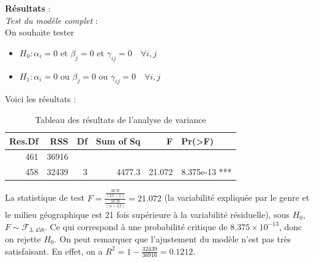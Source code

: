 \documentclass[12pt,a4paper]{article}
\begin{document}
	\textbf{Résultats} : \\
	\textit{Test du modèle complet} : \\
	On souhaite tester
	\begin{itemize}
		\item $H_0 : \alpha_i = 0$ et $\beta_j = 0$ et $\gamma_{ij} = 0 \quad \forall i,j$ 
		\item $H_1 : \alpha_i = 0$ ou $\beta_j = 0$ ou $\gamma_{ij} = 0 \quad \forall i,j$ 
	\end{itemize}
	Voici les résultats :
	\begin{table}[H]
		\centering
		\begin{tabular}{rrrrrl}
			\toprule
			\textbf{Res.Df} & \textbf{RSS} & \textbf{Df} & \textbf{Sum of Sq} & \textbf{F} & \textbf{Pr(>F)} \\
			\midrule
			461 & 36916 &    &         &         &        \\
			458 & 32439 &  3 & 4477.3  & 21.072  & 8.375e-13 *** \\
			\bottomrule
		\end{tabular}
		\caption{Tableau des résultats de l'analyse de variance}
		\label{tab:anova_results}
	\end{table}
	La statistique de test $F = \frac{\frac{SCE}{(IJ - 1)}}{\frac{SCR}{(n - IJ)}} = 21.072$ (la variabilité expliquée par le genre et le milieu géographique est 21 fois supérieure à la variabilité résiduelle), sous $H_0$, $F \sim \mathcal{F}_{3,458}$. Ce qui correspond à une probabilité critique de $8.375 \times 10^{-13}$, donc on rejette $H_0$.
	On peut remarquer que l'ajustement du modèle n'est pas très satisfaisant. En effet, on a $R^2 = 1 - \frac{32439}{36916} = 0.1212$.\\
	
\end{document}
